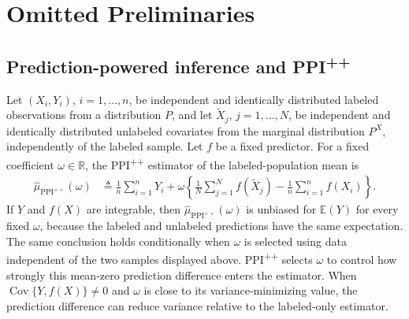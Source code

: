 \section{Omitted Preliminaries}
\label{app:omitted-preliminaries}

\subsection{Prediction-powered inference and
\texorpdfstring{PPI\textsuperscript{++}}{PPI++}}
\label{sec:ppi-background}

Let $(X_i,Y_i)$, $i=1,\ldots,n$, be independent and identically distributed labeled observations from a distribution $P$, and let $\widetilde X_j$, $j=1,\ldots,N$, be independent and identically distributed unlabeled covariates from the marginal distribution $P^X$, independently of the labeled sample. Let $f$ be a fixed predictor. For a fixed coefficient $\omega\in\mathbb R$, the PPI\textsuperscript{++} estimator \citep{angelopoulos2024ppipp} of the labeled-population mean is
\begin{align}
	\widehat\mu_{\mathrm{PPI}^{++}}(\omega)
	&\triangleq
	\frac1n\sum_{i=1}^nY_i
	+\omega\left\{
	\frac1N\sum_{j=1}^N f(\widetilde X_j)
	-\frac1n\sum_{i=1}^n f(X_i)
	\right\}.
\end{align}
If $Y$ and $f(X)$ are integrable, then $\widehat\mu_{\mathrm{PPI}^{++}}(\omega)$ is unbiased for $\mathbb E(Y)$ for every fixed $\omega$, because the labeled and unlabeled predictions have the same expectation. The same conclusion holds conditionally when $\omega$ is selected using data independent of the two samples displayed above. PPI\textsuperscript{++} selects $\omega$ to control how strongly this mean-zero prediction difference enters the estimator. When $\operatorname{Cov}\{Y,f(X)\}\neq0$ and $\omega$ is close to its variance-minimizing value, the prediction difference can reduce variance relative to the labeled-only estimator.
